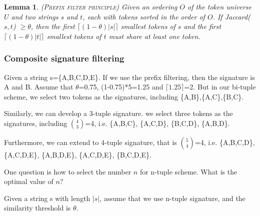 \documentclass{sig-alternate}
\newtheorem{lem}[theorem]{Lemma}
\renewcommand{\geq}{\geqslant}
\begin{document}
\begin{lem} (\textsc{Prefix filter principle}) \cite{conf/icde/ChaudhuriGK06} Given an
ordering $O$ of the token universe $U$ and two strings $s$ and $t$, each with tokens sorted in the
order of $O$.   If Jaccard($s, t$) $\geq \theta$, then the first $\lceil(1-\theta)|s|\rceil$ smallest
tokens of $s$ and the first $\lceil(1-\theta)|t|\rceil$ smallest
tokens of $t$  must share at least one token.
\end{lem}

%
%
%
%
%
%


\subsubsection{Composite signature filtering}


Given a string s=\{A,B,C,D,E\}. If we use the prefix filtering, then the signature is A and B. Assume that $\theta$=0.75, (1-0.75)*5=1.25 and $\lceil 1.25 \rceil$=2. But in our bi-tuple scheme, we select two tokens as the signatures, including \{A,B\},\{A,C\},\{B,C\}.

Similarly, we can develop a 3-tuple signature. we select three tokens as the signatures, including $\binom{4}{3}$=4, i.e. \{A,B,C\}, \{A,C,D\}, \{B,C,D\}, \{A,B,D\}.

Furthermore, we can extend to 4-tuple signature, that is $\binom{5}{4}$=4, i.e. \{A,B,C,D\}, \{A,C,D,E\}, \{A,B,D,E\}, \{A,C,D,E\}, \{B,C,D,E\}.

One question is how to select the number $n$ for n-tuple scheme. What is the optimal value of $n$?

Given a string s with length $|s|$, assume that we use n-tuple signature, and the similarity threshold is $\theta$.
\end{document}
